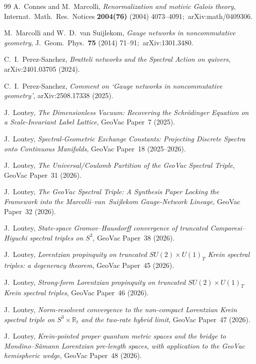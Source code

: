 \documentclass[11pt,a4paper]{article}
\theoremstyle{plain}
\theoremstyle{definition}
\begin{document}
\begin{thebibliography}{99}
A.~Connes and M.~Marcolli, \emph{Renormalization and motivic Galois
theory}, Internat.\ Math.\ Res.\ Notices \textbf{2004(76)} (2004)
4073--4091;\ arXiv:math/0409306.

M.~Marcolli and W.~D.~van Suijlekom, \emph{Gauge networks in
noncommutative geometry}, J.~Geom.\ Phys.\ \textbf{75} (2014)
71--91;\ arXiv:1301.3480.

C.~I.~Perez-Sanchez, \emph{Bratteli networks and the Spectral
Action on quivers}, arXiv:2401.03705 (2024).

C.~I.~Perez-Sanchez, \emph{Comment on `Gauge networks in
noncommutative geometry'}, arXiv:2508.17338 (2025).

J.~Loutey, \emph{The Dimensionless Vacuum: Recovering the
Schr\"odinger Equation on a Scale-Invariant Label Lattice}, GeoVac Paper~7
(2025).

J.~Loutey, \emph{Spectral-Geometric Exchange Constants: Projecting
Discrete Spectra onto Continuous Manifolds}, GeoVac Paper~18 (2025--2026).

J.~Loutey, \emph{The Universal/Coulomb Partition of the
GeoVac Spectral Triple}, GeoVac Paper~31 (2026).

J.~Loutey, \emph{The GeoVac Spectral Triple: A Synthesis Paper Locking
the Framework into the Marcolli--van~Suijlekom Gauge-Network Lineage}, GeoVac Paper~32 (2026).

J.~Loutey, \emph{State-space Gromov--Hausdorff convergence of truncated
Camporesi--Higuchi spectral triples on $S^3$}, GeoVac Paper~38 (2026).

J.~Loutey, \emph{Lorentzian propinquity
on truncated $SU(2) \times U(1)_T$ Krein spectral triples: a degeneracy
theorem}, GeoVac Paper~45 (2026).

J.~Loutey, \emph{Strong-form Lorentzian propinquity on truncated
$SU(2) \times U(1)_T$ Krein spectral triples}, GeoVac Paper~46 (2026).

J.~Loutey, \emph{Norm-resolvent convergence to the non-compact Lorentzian Krein
spectral triple on $S^3\times\mathbb{R}_t$ and the two-rate hybrid limit}, GeoVac
Paper~47 (2026).

J.~Loutey, \emph{Krein-pointed proper quantum metric spaces and the bridge to
Mondino--S\"amann Lorentzian pre-length spaces, with application to the
GeoVac hemispheric wedge}, GeoVac Paper~48 (2026).


\end{thebibliography}
\end{document}
